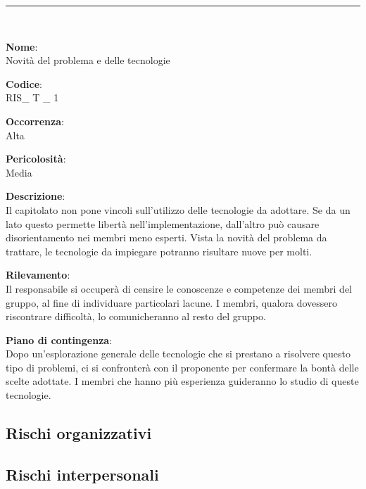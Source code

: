 \noindent\rule{\textwidth}{1pt}\\

{\setlength{\parindent}{0cm}
\begin{minipage}{\textwidth} 
\begin{multicols}{4}
\textbf{Nome}: \\ Novità del problema e delle tecnologie \columnbreak

\textbf{Codice}: \\ RIS\_ T \_ 1 
\columnbreak

\textbf{Occorrenza}: \\ Alta 
\columnbreak

\textbf{Pericolosità}: \\ Media

\end{multicols}

\begin{multicols}{3}

\textbf{Descrizione}: \\ Il capitolato non pone vincoli sull'utilizzo delle tecnologie da adottare. Se da un lato questo permette libertà nell'implementazione, dall'altro può causare disorientamento nei membri meno esperti. Vista la novità del problema da trattare, le tecnologie da impiegare potranno risultare nuove per molti.
\columnbreak

\textbf{Rilevamento}: \\ Il responsabile si occuperà di censire le conoscenze e competenze dei membri del gruppo, al fine di individuare particolari lacune. I membri, qualora dovessero riscontrare difficoltà, lo comunicheranno al resto del gruppo.  
\columnbreak

\textbf{Piano di contingenza}: \\ Dopo un'esplorazione generale delle tecnologie che si prestano a risolvere questo tipo di problemi, ci si confronterà con il proponente per confermare la bontà delle scelte adottate. I membri che hanno più esperienza guideranno lo studio di queste tecnologie.\\

\columnbreak
\end{multicols}
\end{minipage}}



\subsection{Rischi organizzativi}



\subsection{Rischi interpersonali}

